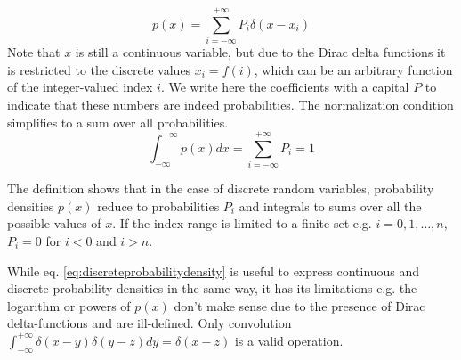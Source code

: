 \documentclass{tstextbook}
\begin{document}
\begin{definition}
  \label{th:discreteprobabilitydensity}
  \begin{equation}
  \label{eq:discreteprobabilitydensity}
    p(x)=\sum_{i=-\infty}^{+\infty}P_i\delta\left(x-x_i\right)
  \end{equation}
  Note that $x$ is still a continuous variable, but due to the Dirac delta functions it is restricted to the discrete values $x_i=f(i)$, which can be an arbitrary function of the integer-valued index $i$. We write here the coefficients with a capital $P$ to indicate that these numbers are indeed probabilities.
The normalization condition simplifies to a sum over all probabilities.
     \begin{equation}
    \int_{-\infty}^{+\infty}p(x)dx=\sum_{i=-\infty}^{+\infty}P_i=1
  \end{equation}
\end{definition}
The definition shows that in the case of discrete random variables, probability densities $p(x)$ reduce to probabilities $P_i$ and integrals to sums over all the possible values of $x$. If the index range is limited to a finite set e.g. $i=0,1,\ldots,n$, $P_i=0$ for $i<0$ and $i>n$.

\begin{remark}
While eq. \ref{eq:discreteprobabilitydensity} is useful to express continuous and discrete probability densities in the same way, it has its limitations e.g. the logarithm or powers of $p(x)$ don't make sense due to the presence of Dirac delta-functions and are ill-defined. Only convolution 
$\int_{-\infty}^{+\infty}\delta\left(x-y\right)\delta\left(y-z\right)dy=\delta\left(x-z\right)$
is a valid operation.
\end{remark}
\end{document}
